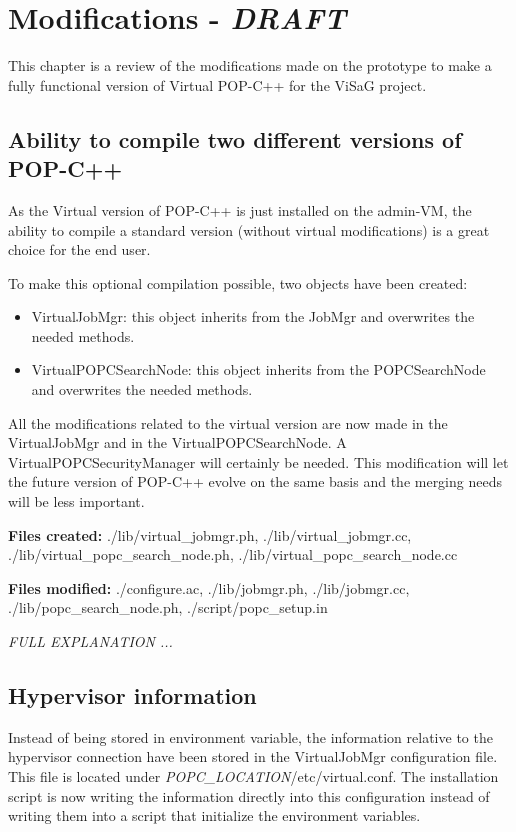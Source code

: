 \section{Modifications - \textit{DRAFT}}
\label{modifications}

This chapter is a review of the modifications made on the prototype to make a fully functional version of Virtual POP-C++ for the ViSaG project.

\subsection{Ability to compile two different versions of POP-C++}
As the Virtual version of POP-C++ is just installed on the admin-VM, the ability to compile a standard version (without virtual modifications) is a great choice for the end user. \s

To make this optional compilation possible, two objects have been created: 

\begin{itemize}
\item VirtualJobMgr: this object inherits from the JobMgr and overwrites the needed methods. 
\item VirtualPOPCSearchNode: this object inherits from the POPCSearchNode and overwrites the needed methods.
\end{itemize}

All the modifications related to the virtual version are now made in the VirtualJobMgr and in the VirtualPOPCSearchNode. A VirtualPOPCSecurityManager will certainly be needed. This modification will let the future version of POP-C++ evolve on the same basis and the merging needs will be less important. \s

\textbf{Files created:} ./lib/virtual\_jobmgr.ph, ./lib/virtual\_jobmgr.cc, ./lib/virtual\_popc\_search\_node.ph, ./lib/virtual\_popc\_search\_node.cc\s

\textbf{Files modified:} ./configure.ac, ./lib/jobmgr.ph, ./lib/jobmgr.cc, ./lib/popc\_search\_node.ph, ./script/popc\_setup.in\s

\textit{FULL EXPLANATION ...}

%
%

\subsection{Hypervisor information}
Instead of being stored in environment variable, the information relative to the hypervisor connection have been stored in the VirtualJobMgr configuration file. This file is located under \textit{POPC\_LOCATION}/etc/virtual.conf. The installation script is now writing the information directly into this configuration instead of writing them into a script that initialize the environment variables. \s

